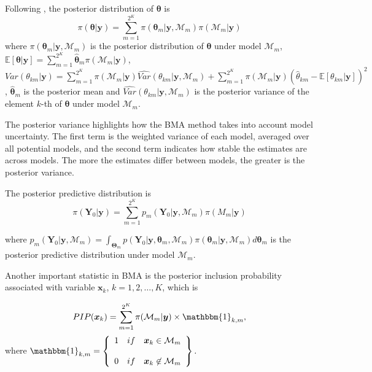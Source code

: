Following \cite{Raftery93}, the posterior distribution of $\bm{\theta}$ is 
\begin{equation*}
	\pi(\bm{\theta}|\bm{y})= \sum_{m=1}^{2^K}\pi(\bm{\theta}_m|\bm{y},\mathcal{M}_m) \pi(\mathcal{M}_m|\bm{y})
\end{equation*}
where $\pi(\bm{\theta}_m|\bm{y},\mathcal{M}_m)$ is the posterior distribution of $\bm{\theta}$ under model $\mathcal{M}_m$, $\mathbb{E}[\bm{\theta}|\bm{y}]=\sum_{m=1}^{2^K}\hat{\bm{\theta}}_m \pi(\mathcal{M}_m|\bm{y})$, $Var({\theta}_{km}|\bm{y})= \sum_{m=1}^{2^K}\pi(\mathcal{M}_m|\bm{y}) \widehat{Var} ({\theta}_{km}|\bm{y},\mathcal{M}_m)+\sum_{m=1}^{2^K} \pi(\mathcal{M}_m|\bm{y}) (\hat{{\theta}}_{km}-\mathbb{E}[{\theta}_{km}|\bm{y}])^2$, $\hat{\bm{\theta}}_m$ is the posterior mean and $\widehat{Var}({\theta}_{km}|\bm{y},\mathcal{M}_m)$ is the posterior variance of the element $k$-th of $\bm{\theta}$ under model $\mathcal{M}_m$.

The posterior variance highlights how the BMA method takes into account
model uncertainty. The first term is the weighted variance of each model, averaged over all potential models, and the second term indicates how stable the estimates are across models. The more the estimates differ between models, the greater is the posterior variance.

The posterior predictive distribution is
\begin{equation*}
	\pi(\bm{Y}_0|\bm{y})= \sum_{m=1}^{2^K}p_m(\bm{Y}_0|\bm{y},\mathcal{M}_m) \pi(M_m|\bm{y})
\end{equation*}

where $p_m(\bm{Y}_0|\bm{y},\mathcal{M}_m)=\int_{\bm{\Theta}_m} p(\bm{Y}_0|\bm{y},\bm{\theta}_m,\mathcal{M}_m)\pi(\bm{\theta}_m |\bm{y}, \mathcal{M}_m) d\bm{\theta}_{m}$ is the posterior predictive distribution under model $\mathcal{M}_m$. 

Another important statistic in BMA is the posterior inclusion probability associated with variable $\bm{x}_k$, $k=1,2,\dots,K$, which is

\begin{equation*}
	PIP(\bm{x}_k)=\sum_{m=1}^{2^K}\pi(\mathcal{M}_m|\bm{y})\times \mathbbm{1}_{k,m},
\end{equation*}
where
$\mathbbm{1}_{k,m}= \left\{ \begin{array}{lcc}
	1&   if  & \bm{x}_{k}\in \mathcal{M}_m \\
	\\ 0 &  if & \bm{x}_{k}\not \in \mathcal{M}_m
\end{array}
\right\}.$\\

